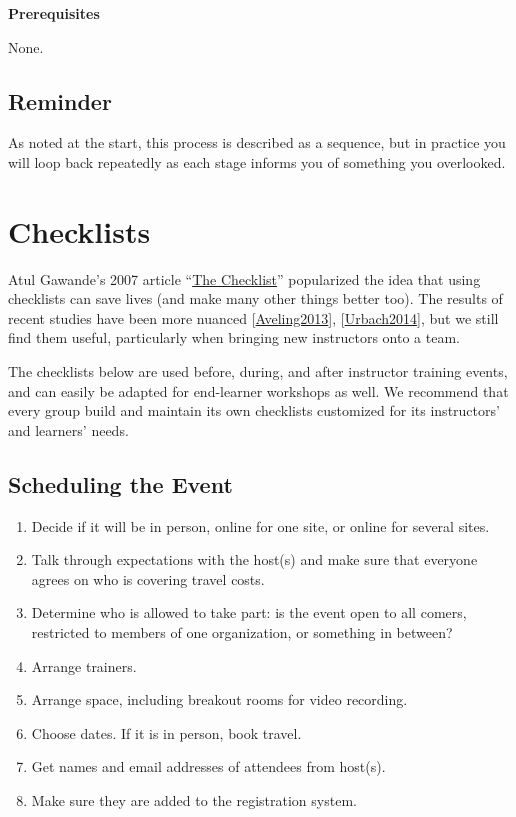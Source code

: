 \documentclass[10pt,statementpaper]{memoir}
\providecommand{\tightlist}{%
  \setlength{\itemsep}{0pt}\setlength{\parskip}{0pt}}
\begin{document}
\textbf{Prerequisites}

None.

\section{Reminder}\label{reminder}

As noted at the start, this process is described as a sequence, but in
practice you will loop back repeatedly as each stage informs you of
something you overlooked.

\chapter{Checklists}\label{checklists}

Atul Gawande's 2007 article
``\href{http://www.newyorker.com/magazine/2007/12/10/the-checklist}{The
Checklist}'' popularized the idea that using checklists can save lives
(and make many other things better too). The results of recent studies
have been more nuanced
{[}\href{biblio.html\#aveling-checklists}{Aveling2013}{]},
{[}\href{biblio.html\#urbach-checklists}{Urbach2014}{]}, but we still
find them useful, particularly when bringing new instructors onto a
team.

The checklists below are used before, during, and after instructor
training events, and can easily be adapted for end-learner workshops as
well. We recommend that every group build and maintain its own
checklists customized for its instructors' and learners' needs.

\section{Scheduling the Event}\label{scheduling-the-event}

\begin{enumerate}
\def\labelenumi{\arabic{enumi}.}
\tightlist
\item
  Decide if it will be in person, online for one site, or online for
  several sites.
\item
  Talk through expectations with the host(s) and make sure that everyone
  agrees on who is covering travel costs.
\item
  Determine who is allowed to take part: is the event open to all
  comers, restricted to members of one organization, or something in
  between?
\item
  Arrange trainers.
\item
  Arrange space, including breakout rooms for video recording.
\item
  Choose dates. If it is in person, book travel.
\item
  Get names and email addresses of attendees from host(s).
\item
  Make sure they are added to the registration system.
\end{enumerate}
\end{document}
